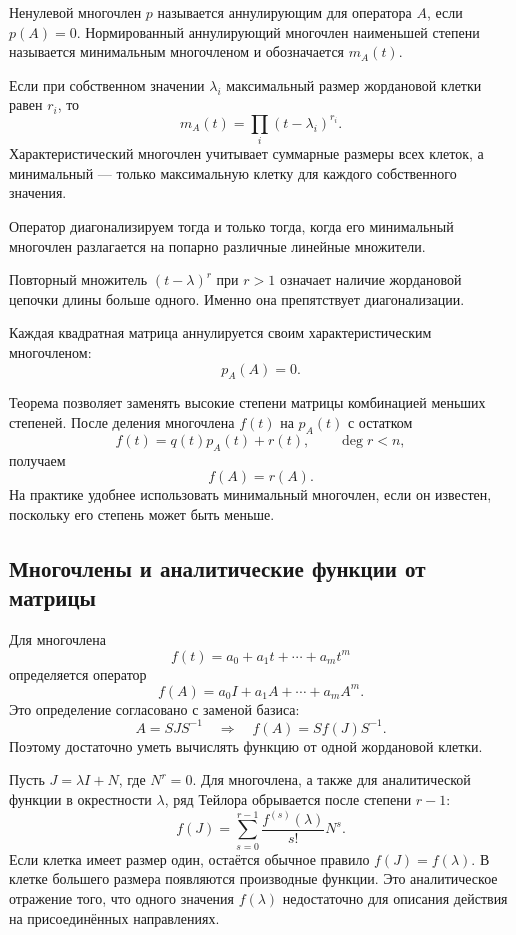 \begin{definition}
Ненулевой многочлен $p$ называется аннулирующим для оператора $A$, если $p(A)=0$. Нормированный аннулирующий многочлен наименьшей степени называется минимальным многочленом и обозначается $m_A(t)$.
\end{definition}

Если при собственном значении $\lambda_i$ максимальный размер жордановой клетки равен $r_i$, то
\[
m_A(t)=\prod_i(t-\lambda_i)^{r_i}.
\]
Характеристический многочлен учитывает суммарные размеры всех клеток, а минимальный --- только максимальную клетку для каждого собственного значения.

\begin{criterion}
Оператор диагонализируем тогда и только тогда, когда его минимальный многочлен разлагается на попарно различные линейные множители.
\end{criterion}

Повторный множитель $(t-\lambda)^r$ при $r>1$ означает наличие жордановой цепочки длины больше одного. Именно она препятствует диагонализации.

\begin{theorem}
Каждая квадратная матрица аннулируется своим характеристическим многочленом:
\[
p_A(A)=0.
\]
\end{theorem}

Теорема позволяет заменять высокие степени матрицы комбинацией меньших степеней. После деления многочлена $f(t)$ на $p_A(t)$ с остатком
\[
f(t)=q(t)p_A(t)+r(t),
\qquad
\deg r<n,
\]
получаем
\[
f(A)=r(A).
\]
На практике удобнее использовать минимальный многочлен, если он известен, поскольку его степень может быть меньше.

\subsection{Многочлены и аналитические функции от матрицы}

Для многочлена
\[
f(t)=a_0+a_1t+\cdots+a_mt^m
\]
определяется оператор
\[
f(A)=a_0I+a_1A+\cdots+a_mA^m.
\]
Это определение согласовано с заменой базиса:
\[
A=SJS^{-1}
\quad\Longrightarrow\quad
f(A)=Sf(J)S^{-1}.
\]
Поэтому достаточно уметь вычислять функцию от одной жордановой клетки.

Пусть $J=\lambda I+N$, где $N^r=0$. Для многочлена, а также для аналитической функции в окрестности $\lambda$, ряд Тейлора обрывается после степени $r-1$:
\[
f(J)
=
\sum_{s=0}^{r-1}
\frac{f^{(s)}(\lambda)}{s!}N^s.
\]
Если клетка имеет размер один, остаётся обычное правило $f(J)=f(\lambda)$. В клетке большего размера появляются производные функции. Это аналитическое отражение того, что одного значения $f(\lambda)$ недостаточно для описания действия на присоединённых направлениях.

